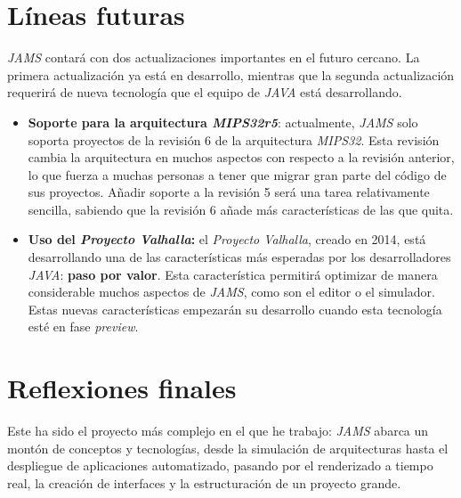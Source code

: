 
\section{Líneas futuras}\label{sec:líneas-futuras}

\textit{JAMS} contará con dos actualizaciones importantes en el
futuro cercano.
La primera actualización ya está en desarrollo, mientras que la
segunda actualización requerirá de nueva tecnología que
el equipo de \textit{JAVA} está desarrollando.
\begin{itemize}
    \item \textbf{Soporte para la arquitectura \textit{MIPS32r5}}:
    actualmente, \textit{JAMS} solo soporta proyectos de la revisión 6
    de la arquitectura \textit{MIPS32}.
    Esta revisión cambia la arquitectura en muchos aspectos con respecto
    a la revisión anterior, lo que fuerza a muchas personas a tener
    que migrar gran parte del código de sus proyectos.
    Añadir soporte a la revisión 5 será una tarea relativamente sencilla,
    sabiendo que la revisión 6 añade más características de las que quita.
    \item \textbf{Uso del \textit{Proyecto Valhalla}:} el
    \textit{Proyecto Valhalla}\cite{PROJECT_VALHALLA}, creado en 2014,
    está desarrollando una de las características más esperadas
    por los desarrolladores \textit{JAVA}: \textbf{paso por valor}.
    Esta característica permitirá optimizar de manera considerable
    muchos aspectos de \textit{JAMS}, como son el editor o el simulador.
    Estas nuevas características empezarán su desarrollo cuando esta
    tecnología esté en fase \textit{preview}.
\end{itemize}

\section{Reflexiones finales}\label{sec:reflexiones-finales}

Este ha sido el proyecto más complejo en el que he trabajo:
\textit{JAMS} abarca un montón de conceptos y tecnologías,
desde la simulación de arquitecturas hasta el despliegue de
aplicaciones automatizado, pasando por el renderizado a tiempo
real, la creación de interfaces y la estructuración de un
proyecto grande.

